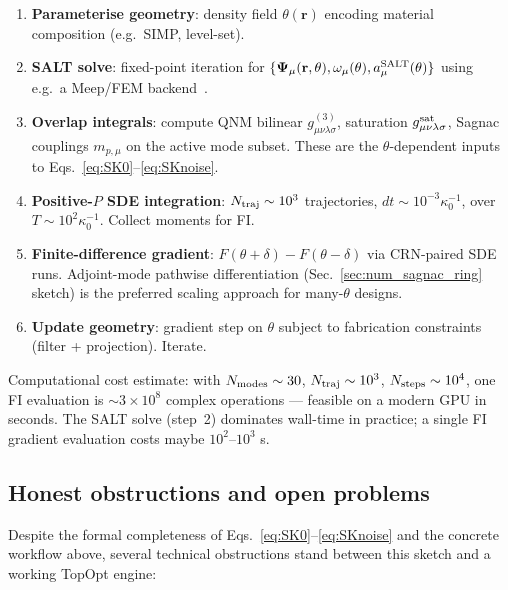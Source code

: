 \documentclass[11pt]{article}
\begin{document}
\begin{enumerate}\itemsep0.2em
\item\textbf{Parameterise geometry}: density field $\theta(\mathbf{r})$
  encoding material composition (e.g.\ SIMP, level-set).
\item\textbf{SALT solve}: fixed-point iteration for
  $\{\mathbf{\Psi}_\mu(\mathbf{r},\theta), \omega_\mu(\theta),
  a_\mu^{\rm SALT}(\theta)\}$ using e.g.\ a Meep/FEM
  backend~\cite{EsterhazyLiertzerCerjan2014}.
\item\textbf{Overlap integrals}: compute QNM bilinear
  $g^{(3)}_{\mu\nu\lambda\sigma}$, saturation
  $g^{\rm sat}_{\mu\nu\lambda\sigma}$, Sagnac couplings $m_{p,\mu}$ on
  the active mode subset.  These are the $\theta$-dependent inputs to
  Eqs.~\eqref{eq:SK0}--\eqref{eq:SKnoise}.
\item\textbf{Positive-$P$ SDE integration}: $N_{\rm traj}\sim 10^3$
  trajectories, $dt\sim 10^{-3}\kappa_0^{-1}$, over $T\sim 10^2\kappa_0^{-1}$.
  Collect moments for FI.
\item\textbf{Finite-difference gradient}: $F(\theta+\delta)-F(\theta-\delta)$
  via CRN-paired SDE runs.  Adjoint-mode pathwise differentiation
  (Sec.~\ref{sec:num_sagnac_ring} sketch) is the preferred scaling
  approach for many-$\theta$ designs.
\item\textbf{Update geometry}: gradient step on $\theta$ subject to
  fabrication constraints (filter + projection).  Iterate.
\end{enumerate}

Computational cost estimate: with $N_{\rm modes}\sim 30$,
$N_{\rm traj}\sim 10^3$, $N_{\rm steps}\sim 10^4$, one FI evaluation is
$\sim 3\times 10^8$ complex operations --- feasible on a modern GPU in
seconds.  The SALT solve (step~2) dominates wall-time in practice; a
single FI gradient evaluation costs maybe $10^2$--$10^3$ s.

\subsection{Honest obstructions and open problems}
\label{sec:salt_obstructions}

Despite the formal completeness of
Eqs.~\eqref{eq:SK0}--\eqref{eq:SKnoise} and the concrete workflow above,
several technical obstructions stand between this sketch and a working
TopOpt engine:
\end{document}
